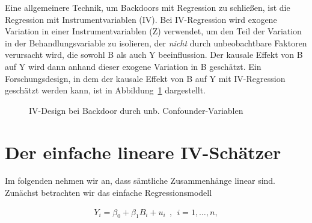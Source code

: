 \documentclass[
  a4paper,
  DIV=11,
  oneside]{scrreprt}
\begin{document}
Eine allgemeinere Technik, um Backdoors mit Regression zu schließen, ist
die Regression mit Instrumentvariablen (IV). Bei IV-Regression wird
exogene Variation in einer Instrumentvariablen (Z) verwendet, um den
Teil der Variation in der Behandlungsvariable zu isolieren, der
\emph{nicht} durch unbeobachtbare Faktoren verursacht wird, die sowohl B
als auch Y beeinflussion. Der kausale Effekt von B auf Y wird dann
anhand dieser exogene Variation in B geschätzt. Ein Forschungsdesign, in
dem der kausale Effekt von B auf Y mit IV-Regression geschätzt werden
kann, ist in Abbildung~\ref{fig-IVDAG1} dargestellt.

\begin{figure}[t]


\caption{\label{fig-IVDAG1}IV-Design bei Backdoor durch unb.
Confounder-Variablen}

\end{figure}%

\section{Der einfache lineare
IV-Schätzer}\label{der-einfache-lineare-iv-schuxe4tzer}

Im folgenden nehmen wir an, dass sämtliche Zusammenhänge linear sind.
Zunächst betrachten wir das einfache Regressionsmodell

\begin{align}
  Y_i = \beta_0 + \beta_1 B_i + u_i \ \ , \ \ i=1,\dots,n, \label{eq:simpleiv}
\end{align}
\end{document}
